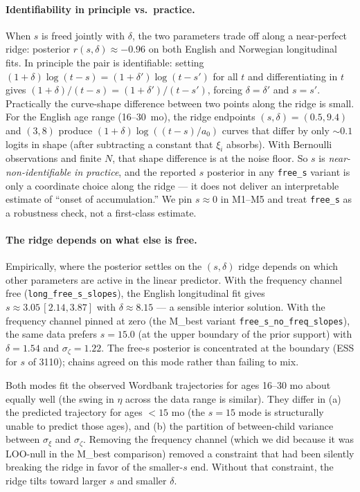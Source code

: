 \documentclass[11pt]{article}
\begin{document}
\paragraph{Identifiability in principle vs.\ practice.}
When \(s\) is freed jointly with \(\delta\), the two parameters trade
off along a near-perfect ridge: posterior
\(r(s, \delta) \approx -0.96\) on both English and Norwegian
longitudinal fits. In principle the pair is identifiable: setting
\((1+\delta)\log(t-s) = (1+\delta')\log(t-s')\) for all \(t\) and
differentiating in \(t\) gives
\((1+\delta)/(t-s) = (1+\delta')/(t-s')\), forcing
\(\delta = \delta'\) and \(s = s'\). Practically the curve-shape
difference between two points along the ridge is small. For the
English age range (16--30~mo), the ridge endpoints
\((s, \delta) = (0.5, 9.4)\) and \((3, 8)\) produce
\((1+\delta)\log\!((t-s)/a_0)\) curves that differ by only \(\sim 0.1\)
logits in shape (after subtracting a constant that \(\xi_i\)
absorbs). With Bernoulli observations and finite \(N\), that shape
difference is at the noise floor. So \(s\) is \emph{near-non-identifiable
in practice}, and the reported \(s\) posterior in any
\texttt{free\_s} variant is only a coordinate choice along the ridge
— it does not deliver an interpretable estimate of ``onset of
accumulation.'' We pin \(s \approx 0\) in M1--M5 and treat
\texttt{free\_s} as a robustness check, not a first-class estimate.

\paragraph{The ridge depends on what else is free.}
Empirically, where the posterior settles on the \((s, \delta)\) ridge
depends on which other parameters are active in the linear predictor.
With the frequency channel free (\texttt{long\_free\_s\_slopes}), the
English longitudinal fit gives \(s \approx 3.05\,[2.14, 3.87]\) with
\(\delta \approx 8.15\) — a sensible interior solution. With the
frequency channel pinned at zero (the M\_best variant
\texttt{free\_s\_no\_freq\_slopes}), the same data prefers
\(s = 15.0\) (at the upper boundary of the prior support) with
\(\delta = 1.54\) and \(\sigma_\zeta = 1.22\). The free-s posterior
is concentrated at the boundary (ESS for \(s\) of 3110); chains agreed
on this mode rather than failing to mix.

Both modes fit the observed Wordbank trajectories for ages 16--30 mo
about equally well (the swing in \(\eta\) across the data range is
similar). They differ in (a) the predicted trajectory for ages
\(< 15\) mo (the \(s = 15\) mode is structurally unable to predict
those ages), and (b) the partition of between-child variance between
\(\sigma_\xi\) and \(\sigma_\zeta\). Removing the frequency channel
(which we did because it was LOO-null in the M\_best comparison)
removed a constraint that had been silently breaking the ridge in
favor of the smaller-\(s\) end. Without that constraint, the ridge
tilts toward larger \(s\) and smaller \(\delta\).
\end{document}
